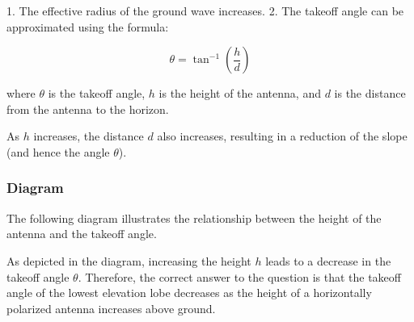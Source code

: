 1. The effective radius of the ground wave increases.
2. The takeoff angle can be approximated using the formula:

\[
\theta = \tan^{-1}\left(\frac{h}{d}\right)
\]

where \( \theta \) is the takeoff angle, \( h \) is the height of the antenna, and \( d \) is the distance from the antenna to the horizon.

As \(h\) increases, the distance \(d\) also increases, resulting in a reduction of the slope (and hence the angle \(\theta\)).

\subsubsection{Diagram}

The following diagram illustrates the relationship between the height of the antenna and the takeoff angle. 

\begin{center}
\end{center}

As depicted in the diagram, increasing the height \(h\) leads to a decrease in the takeoff angle \(\theta\). Therefore, the correct answer to the question is that the takeoff angle of the lowest elevation lobe decreases as the height of a horizontally polarized antenna increases above ground.